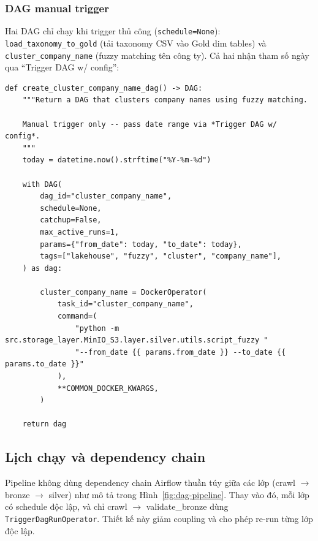 \subsubsection{DAG manual trigger}

Hai DAG chỉ chạy khi trigger thủ công (\texttt{schedule=None}):
\texttt{load\_taxonomy\_to\_gold} (tải taxonomy CSV vào Gold dim tables) và
\texttt{cluster\_company\_name} (fuzzy matching tên công ty). Cả hai nhận
tham số ngày qua ``Trigger DAG w/ config'':

\begin{lstlisting}[style=pystyle, caption={create\_cluster\_company\_name\_dag — manual trigger, nhận date range}]
def create_cluster_company_name_dag() -> DAG:
    """Return a DAG that clusters company names using fuzzy matching.

    Manual trigger only -- pass date range via *Trigger DAG w/ config*.
    """
    today = datetime.now().strftime("%Y-%m-%d")

    with DAG(
        dag_id="cluster_company_name",
        schedule=None,
        catchup=False,
        max_active_runs=1,
        params={"from_date": today, "to_date": today},
        tags=["lakehouse", "fuzzy", "cluster", "company_name"],
    ) as dag:

        cluster_company_name = DockerOperator(
            task_id="cluster_company_name",
            command=(
                "python -m src.storage_layer.MinIO_S3.layer.silver.utils.script_fuzzy "
                "--from_date {{ params.from_date }} --to_date {{ params.to_date }}"
            ),
            **COMMON_DOCKER_KWARGS,
        )

    return dag
\end{lstlisting}

\subsection{Lịch chạy và dependency chain}
\label{subsec:schedules}

Pipeline không dùng dependency chain Airflow thuần túy giữa các lớp (crawl
$\to$ bronze $\to$ silver) như mô tả trong Hình~\ref{fig:dag-pipeline}. Thay vào đó,
mỗi lớp có schedule độc lập, và chỉ crawl $\to$ validate\_bronze dùng
\texttt{TriggerDagRunOperator}. Thiết kế này giảm coupling và cho phép re-run
từng lớp độc lập.

